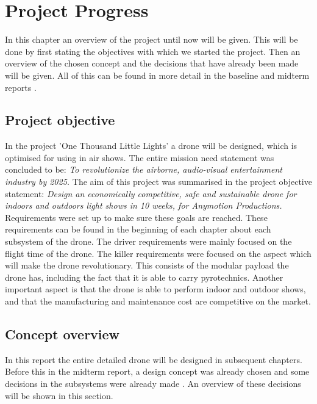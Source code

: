 \chapter{Project Progress}
\label{ch:ProjectProgress}




In this chapter an overview of the project until now will be given. This will be done by first stating the objectives with which we started the project. Then an overview of the chosen concept and the decisions that have already been made will be given. All of this can be found in more detail in the baseline and midterm reports \cite{baseline-report} \cite{midterm}. 

\section{Project objective}
\label{sec:projectobjective}

In the project 'One Thousand Little Lights' a drone will be designed, which is optimised for using in air shows. The entire mission need statement was concluded to be: \textit{To revolutionize the airborne, audio-visual entertainment industry by 2025.} The aim of this project was summarised in the project objective statement: \textit{Design an economically competitive, safe and sustainable drone for indoors and outdoors light shows in 10 weeks, for Anymotion Productions.} Requirements were set up to make sure these goals are reached. These requirements can be found in the beginning of each chapter about each subsystem of the drone. The driver requirements were mainly focused on the flight time of the drone. The killer requirements were focused on the aspect which will make the drone revolutionary. This consists of the modular payload the drone has, including the fact that it is able to carry pyrotechnics. Another important aspect is that the drone is able to perform indoor and outdoor shows, and that the manufacturing and maintenance cost are competitive on the market. 

\section{Concept overview}
\label{sec:conceptoverview}

In this report the entire detailed drone will be designed in subsequent chapters. Before this in the midterm report, a design concept was already chosen and some decisions in the subsystems were already made \cite{midterm}. An overview of these decisions will be shown in this section.

